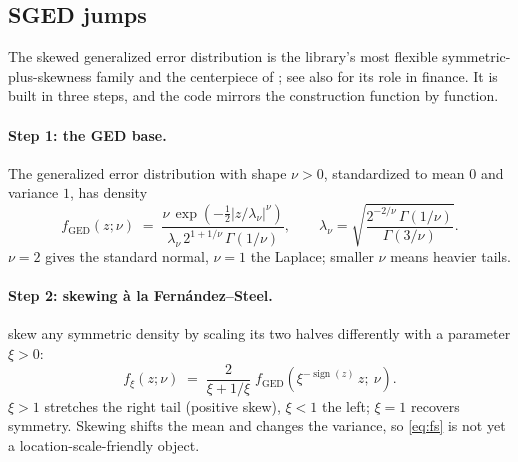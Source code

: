 \subsection{SGED jumps}
\label{sec:sged}

The skewed generalized error distribution is the library's most flexible
symmetric-plus-skewness family and the centerpiece of
\citet{Ospina2009}; see also \citet{Theodossiou2015} for its role in
finance. It is built in three steps, and the code mirrors the construction
function by function.

\paragraph{Step 1: the GED base.}
The generalized error distribution with shape $\nu > 0$, standardized to
mean $0$ and variance $1$, has density
\begin{equation}
  f_{\mathrm{GED}}(z; \nu)
  \;=\;
  \frac{\nu \, \exp\!\left( -\tfrac12 \left| z / \lambda_\nu \right|^{\nu} \right)}
       {\lambda_\nu\, 2^{1 + 1/\nu}\, \Gamma(1/\nu)},
  \qquad
  \lambda_\nu = \sqrt{\frac{2^{-2/\nu}\,\Gamma(1/\nu)}{\Gamma(3/\nu)}} .
  \label{eq:ged}
\end{equation}
$\nu = 2$ gives the standard normal, $\nu = 1$ the Laplace; smaller $\nu$
means heavier tails.

\paragraph{Step 2: skewing \`a la Fern\'andez--Steel.}
\citet{FernandezSteel1998} skew any symmetric density by scaling its two
halves differently with a parameter $\xi > 0$:
\begin{equation}
  f_{\xi}(z; \nu)
  \;=\;
  \frac{2}{\xi + 1/\xi}\;
  f_{\mathrm{GED}}\!\left( \xi^{-\operatorname{sign}(z)}\, z ;\ \nu \right).
  \label{eq:fs}
\end{equation}
$\xi > 1$ stretches the right tail (positive skew), $\xi < 1$ the left;
$\xi = 1$ recovers symmetry. Skewing shifts the mean and changes the
variance, so \eqref{eq:fs} is not yet a location-scale-friendly object.

